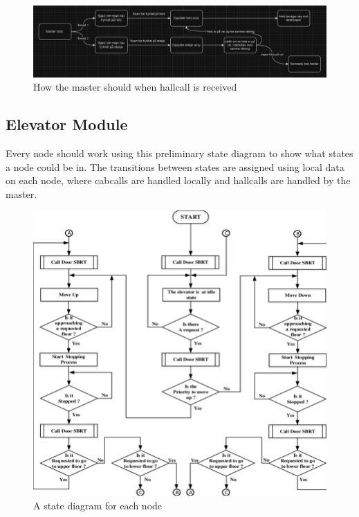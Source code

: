 \begin{figure}[H]
    \centering
    \includegraphics[width=\textwidth]{Images/Master_todo.png}
    \caption{How the master should when hallcall is received}
    \label{fig:master_todo}
\end{figure}

\subsection{Elevator Module}
Every node should work using this preliminary state diagram to show what states a node could be in. The transitions between states are assigned using local data on each node, where cabcalls are handled locally and hallcalls are handled by the master. 

\begin{figure}[H]
    \centering
    \includegraphics[width=\textwidth]{Images/418651894_696195342724008_4289962557826126166_n.png}
    \caption{A state diagram for each node}
    \label{fig:fsm_node}
\end{figure}

